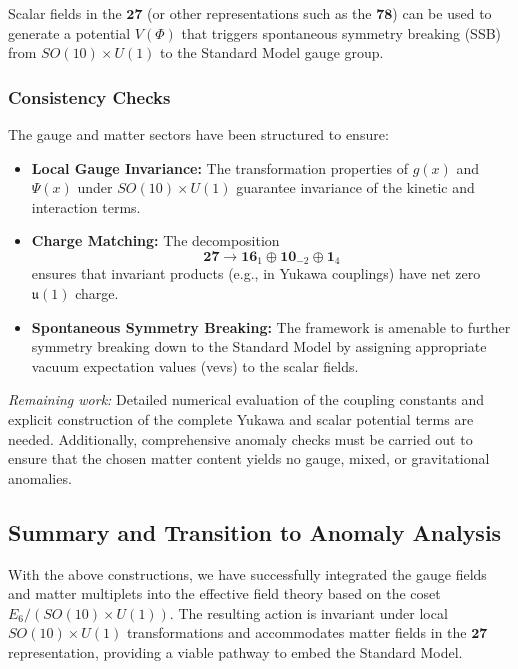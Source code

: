 \documentclass[aps,prd,preprint,groupedaddress]{revtex4-2}
\begin{document}
Scalar fields in the \(\mathbf{27}\) (or other representations such as the \(\mathbf{78}\)) can be used to generate a potential \(V(\Phi)\) that triggers spontaneous symmetry breaking (SSB) from \(SO(10)\times U(1)\) to the Standard Model gauge group.

\subsubsection{Consistency Checks}

The gauge and matter sectors have been structured to ensure:
\begin{itemize}
  \item \textbf{Local Gauge Invariance:} The transformation properties of \(g(x)\) and \(\Psi(x)\) under \(SO(10)\times U(1)\) guarantee invariance of the kinetic and interaction terms.
  \item \textbf{Charge Matching:} The decomposition
    \[
    \mathbf{27} \rightarrow \mathbf{16}_{1} \oplus \mathbf{10}_{-2} \oplus \mathbf{1}_{4}
    \]
    ensures that invariant products (e.g., in Yukawa couplings) have net zero \(\mathfrak{u}(1)\) charge.
  \item \textbf{Spontaneous Symmetry Breaking:} The framework is amenable to further symmetry breaking down to the Standard Model by assigning appropriate vacuum expectation values (vevs) to the scalar fields.
\end{itemize}

\emph{Remaining work:} Detailed numerical evaluation of the coupling constants and explicit construction of the complete Yukawa and scalar potential terms are needed. Additionally, comprehensive anomaly checks must be carried out to ensure that the chosen matter content yields no gauge, mixed, or gravitational anomalies.


\subsection{Summary and Transition to Anomaly Analysis}

With the above constructions, we have successfully integrated the gauge fields and matter multiplets into the effective field theory based on the coset \(E_6/(SO(10)\times U(1))\). The resulting action is invariant under local \(SO(10)\times U(1)\) transformations and accommodates matter fields in the \(\mathbf{27}\) representation, providing a viable pathway to embed the Standard Model. 
\end{document}
